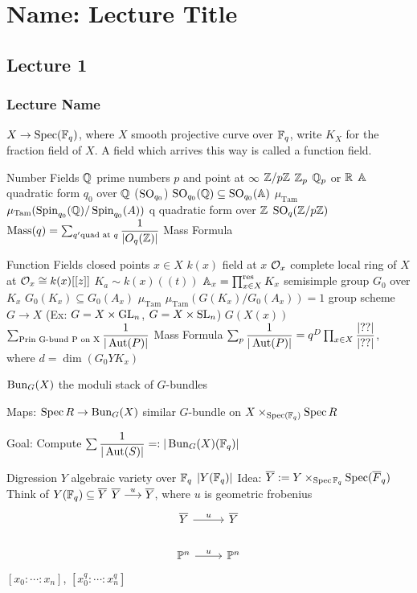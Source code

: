 \newpage
\section{Name: Lecture Title}
\subsection{Lecture 1}
\subsubsection{Lecture Name}


$X \to \spec(\F_q)$, where $X$ smooth projective curve over $\F_q$, write $K_X$ for the fraction field of $X$. A field which arrives this way is called a function field.

\begin{minipage}{0.45\textwidth}
Number Fields
$\Q$ prime numbers $p$ and point at $\infty$
$\Z/p\Z$
$\Z_p$
$\Q_p$ or $\R$
$\A$
quadratic form $q_0$ over $\Q$ ($\so_{q_0}$)
$\so_{q_0}(\Q) \subseteq \so_{q_0}(\A)$
$\mu_\text{Tam}$
$\mu_\text{Tam}(\spin_{q_0}(\Q)/ \spin_{q_0}(A))$
q quadratic form over $\Z$
$\so_q(\Z/p\Z)$
$\mass(q)= \sum_{q' \text{quad at }q} \dfrac{1}{|O_q(\Z)|}$
Mass Formula
\end{minipage} %
%
%
\begin{minipage}{0.5\textwidth}
Function Fields
closed points $x \in X$
$k(x)$ field at $x$
$\O_x$ complete local ring of $X$ at $\O_x \cong k(x)[[z]]$
$K_a \sim k(x)((t))$
$\A_x= \prod_{x \in X}^\text{res} K_x$
semisimple group $G_0$ over $K_x$
$G_0(K_x) \subseteq G_0(A_x)$
$\mu_\text{Tam}$
$\mu_\text{Tam}(G(K_x)/G_0(A_x))=1$
group scheme $G \to X$ (Ex: $G= X \times \gl_n$, $G= X \times \sl_n$)
$G(X(x))$
$\sum_{\text{Prin G-bund P on X}} \dfrac{1}{|\Aut(P)|}$
Mass Formula $\sum_p \dfrac{1}{|\Aut(P)|}= q^D \prod_{x \in X} \dfrac{|??|}{|??|}$, where $d= \dim(G_0 Y K_x)$
\end{minipage}


$\bun_G(X)$ the moduli stack of $G$-bundles

Maps: $\spec R \to \bun_G(X)$
similar $G$-bundle on $X \times_{\spec(\F_q)} \spec R$

Goal: 
Compute $\sum \dfrac{1}{|\Aut(S)|} =: |\bun_G(X)(\F_q)|$

Digression
$Y$ algebraic variety over $\F_q$
$|Y(\F_q)|$
Idea: $\ov{Y}:= Y \times_{\spec \F_q} \spec(\ov{F}_q)$
Think of $Y(\F_q) \subseteq \ov{Y}$
$\ov{Y} \ma{u} \ov{Y}$, where $u$ is geometric frobenius 
	\[
	\begin{tikzcd}
	\ov{Y} \arrow{r}{u} & \ov{Y} \\
	\P^n \arrow{r}{u} & \P^n
	\end{tikzcd}
	\]
$[x_0:\cdots:x_n]$, $[x_0^q:\cdots:x_n^q]$

